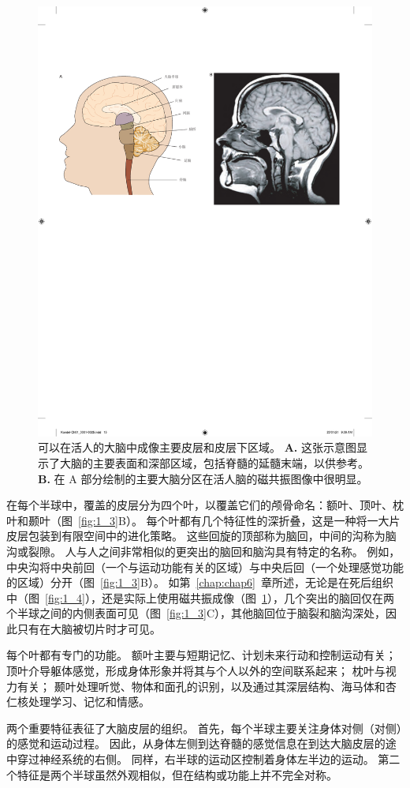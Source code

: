 \begin{figure}[htbp]
	\centering
	\includegraphics[width=0.75\linewidth]{chap01/fig_1_5}
	\caption{可以在活人的大脑中成像主要皮层和皮层下区域。
		\textbf{A.} 这张示意图显示了大脑的主要表面和深部区域，包括脊髓的延髓末端，以供参考。
		\textbf{B.} 在 A 部分绘制的主要大脑分区在活人脑的磁共振图像中很明显。}
	\label{fig:1_5}
\end{figure}


在每个半球中，覆盖的皮层分为四个叶，以覆盖它们的颅骨命名：额叶、顶叶、枕叶和颞叶（图~\ref{fig:1_3}B）。
每个叶都有几个特征性的深折叠，这是一种将一大片皮层包装到有限空间中的进化策略。
这些回旋的顶部称为脑回，中间的沟称为脑沟或裂隙。 
人与人之间非常相似的更突出的脑回和脑沟具有特定的名称。
例如，中央沟将中央前回（一个与运动功能有关的区域）与中央后回（一个处理感觉功能的区域）分开（图~\ref{fig:1_3}B）。
如第~\ref{chap:chap6}~章所述，无论是在死后组织中（图~\ref{fig:1_4}），还是实际上使用磁共振成像（图~\ref{fig:1_5}），几个突出的脑回仅在两个半球之间的内侧表面可见（图~\ref{fig:1_3}C），其他脑回位于脑裂和脑沟深处，因此只有在大脑被切片时才可见。


每个叶都有专门的功能。
额叶主要与短期记忆、计划未来行动和控制运动有关；
顶叶介导躯体感觉，形成身体形象并将其与个人以外的空间联系起来；
枕叶与视力有关；
颞叶处理听觉、物体和面孔的识别，以及通过其深层结构、海马体和杏仁核处理学习、记忆和情感。


两个重要特征表征了大脑皮层的组织。
首先，每个半球主要关注身体对侧（对侧）的感觉和运动过程。
因此，从身体左侧到达脊髓的感觉信息在到达大脑皮层的途中穿过神经系统的右侧。
同样，右半球的运动区控制着身体左半边的运动。
第二个特征是两个半球虽然外观相似，但在结构或功能上并不完全对称。



